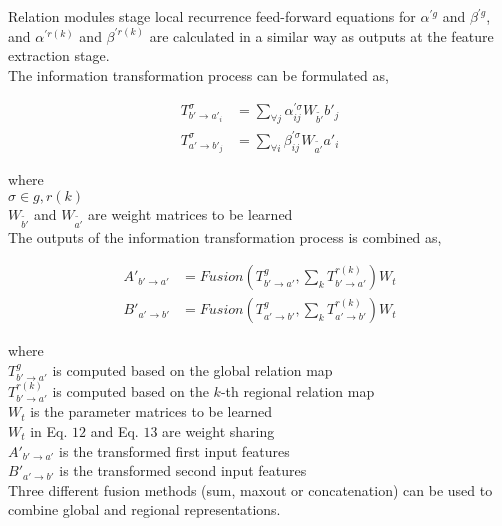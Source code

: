 \documentclass{article}
\begin{document}
\noindent Relation modules stage local recurrence feed-forward equations for $\alpha^{'g}$ and $\beta^{'g}$, and $\alpha^{'r(k)}$ and $\beta^{'r(k)}$ are calculated in a similar way as outputs at the feature extraction stage. \\

\noindent The information transformation process can be formulated as,

\begin{align}
T_{b'\rightarrow a'_{i}}^{\sigma} &= \sum_{\forall j}\alpha_{ij}^{'\sigma}W_{\tilde{b'}}b'_{j} \\
T_{a'\rightarrow b'_{j}}^{\sigma} &= \sum_{\forall i}\beta_{ij}^{'\sigma}W_{\tilde{a'}}a'_{i}
\end{align}

where \\

\indent\indent $\sigma \in {g, r(k)}$ \\
\indent\indent $W_{\tilde{b'}}$ and $W_{\tilde{a'}}$ are weight matrices to be learned \\

The outputs of the information transformation process is combined as,

\begin{align}
A'_{b'\rightarrow a'} &= Fusion\left(T_{b'\rightarrow a'}^{g}, \sum_{k}T_{b'\rightarrow a'}^{r(k)}\right)W_{t} \\
B'_{a'\rightarrow b'} &= Fusion\left(T_{a'\rightarrow b'}^{g}, \sum_{k}T_{a'\rightarrow b'}^{r(k)}\right)W_{t}
\end{align}

where \\

\indent\indent $T_{b'\rightarrow a'}^{g}$ is computed based on the global relation map \\
\indent\indent $T_{b'\rightarrow a'}^{r(k)}$ is computed based on the $k$-th regional relation map \\
\indent\indent $W_{t}$ is the parameter matrices to be learned \\
\indent\indent $W_{t}$ in Eq. $12$ and Eq. $13$ are weight sharing \\
\indent\indent $A'_{b'\rightarrow a'}$ is the transformed first input features \\
\indent\indent $B'_{a'\rightarrow b'}$ is the transformed second input features \\

\noindent Three different fusion methods (sum, maxout or concatenation) can be used to combine global and regional representations. \\
\end{document}
